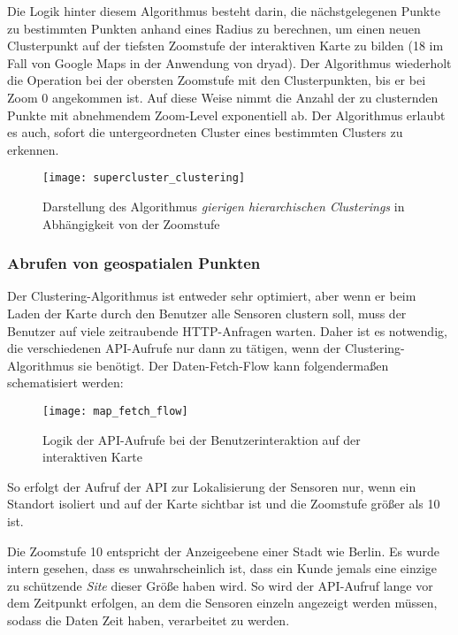 Die Logik hinter diesem Algorithmus besteht darin, die nächstgelegenen Punkte zu bestimmten Punkten anhand eines Radius zu berechnen, um einen neuen Clusterpunkt auf der tiefsten Zoomstufe der interaktiven Karte zu bilden (18 im Fall von Google Maps in der Anwendung von dryad).
Der Algorithmus wiederholt die Operation bei der obersten Zoomstufe mit den Clusterpunkten, bis er bei Zoom 0 angekommen ist.
Auf diese Weise nimmt die Anzahl der zu clusternden Punkte mit abnehmendem Zoom-Level exponentiell ab.
Der Algorithmus erlaubt es auch, sofort die untergeordneten Cluster eines bestimmten Clusters zu erkennen.

\begin{figure}[H]
  \centering
  \texttt{[image: supercluster\_clustering]}
  \caption{Darstellung des Algorithmus \textit{gierigen hierarchischen Clusterings} in Abhängigkeit von der Zoomstufe}
  \label{fig:supercluster_clustering}
\end{figure}

\subsubsection{Abrufen von geospatialen Punkten}

Der Clustering-Algorithmus ist entweder sehr optimiert, aber wenn er beim Laden der Karte durch den Benutzer alle Sensoren clustern soll, muss der Benutzer auf viele zeitraubende \ac{HTTP}-Anfragen warten.
Daher ist es notwendig, die verschiedenen API-Aufrufe nur dann zu tätigen, wenn der Clustering-Algorithmus sie benötigt.
Der Daten-Fetch-Flow kann folgendermaßen schematisiert werden:

\begin{figure}[H]
  \centering
  \texttt{[image: map\_fetch\_flow]}
  \caption{Logik der API-Aufrufe bei der Benutzerinteraktion auf der interaktiven Karte}
  \label{fig:map_fetch_flow}
\end{figure}

So erfolgt der Aufruf der API zur Lokalisierung der Sensoren nur, wenn ein Standort isoliert und auf der Karte sichtbar ist und die Zoomstufe größer als 10 ist.

Die Zoomstufe 10 entspricht der Anzeigeebene einer Stadt wie Berlin.
Es wurde intern gesehen, dass es unwahrscheinlich ist, dass ein Kunde jemals eine einzige zu schützende \textit{Site} dieser Größe haben wird.
So wird der API-Aufruf lange vor dem Zeitpunkt erfolgen, an dem die Sensoren einzeln angezeigt werden müssen, sodass die Daten Zeit haben, verarbeitet zu werden.

